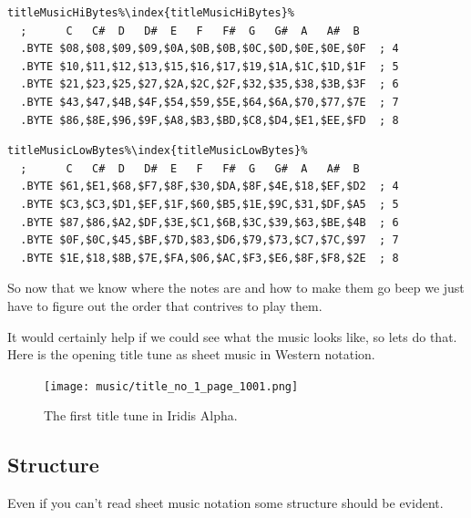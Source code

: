 \begin{lstlisting}[escapechar=\%]
titleMusicHiBytes%\index{titleMusicHiBytes}%
  ;      C   C#  D   D#  E   F   F#  G   G#  A   A#  B
  .BYTE $08,$08,$09,$09,$0A,$0B,$0B,$0C,$0D,$0E,$0E,$0F  ; 4
  .BYTE $10,$11,$12,$13,$15,$16,$17,$19,$1A,$1C,$1D,$1F  ; 5
  .BYTE $21,$23,$25,$27,$2A,$2C,$2F,$32,$35,$38,$3B,$3F  ; 6
  .BYTE $43,$47,$4B,$4F,$54,$59,$5E,$64,$6A,$70,$77,$7E  ; 7
  .BYTE $86,$8E,$96,$9F,$A8,$B3,$BD,$C8,$D4,$E1,$EE,$FD  ; 8
\end{lstlisting}
\clearpage
\begin{lstlisting}[escapechar=\%,caption=The lookup table for all of the notes used in the theme music. The two lowest available octaves\index{octaves} are not
used by the game. To see this for yourself\, compare the first entry in \icode{titleMusicHiBytes\index{titleMusicHiBytes}}/\icode{titleMusicLowBytes\index{titleMusicLowBytes}} (\$08 and \$61\,
giving \$0861) with the entry highlighted in red in the previous table.]
titleMusicLowBytes%\index{titleMusicLowBytes}% 
  ;      C   C#  D   D#  E   F   F#  G   G#  A   A#  B
  .BYTE $61,$E1,$68,$F7,$8F,$30,$DA,$8F,$4E,$18,$EF,$D2  ; 4
  .BYTE $C3,$C3,$D1,$EF,$1F,$60,$B5,$1E,$9C,$31,$DF,$A5  ; 5
  .BYTE $87,$86,$A2,$DF,$3E,$C1,$6B,$3C,$39,$63,$BE,$4B  ; 6
  .BYTE $0F,$0C,$45,$BF,$7D,$83,$D6,$79,$73,$C7,$7C,$97  ; 7
  .BYTE $1E,$18,$8B,$7E,$FA,$06,$AC,$F3,$E6,$8F,$F8,$2E  ; 8
\end{lstlisting}

So now that we know where the notes are and how to make them go beep we just have to figure out the order that 
contrives to play them.

It would certainly help if we could see what the music looks like, so lets do that. Here is the opening title tune as sheet
music in Western notation.

\begin{figure}[H]
{
  \begin{adjustbox}{width=13cm,center}
  \texttt{[image: music/title\_no\_1\_page\_1001.png]}%
    \end{adjustbox}
}\caption[]{The first title tune in Iridis Alpha.}
\end{figure}

\subsection{Structure}
Even if you can't read sheet music notation some structure should be evident.

